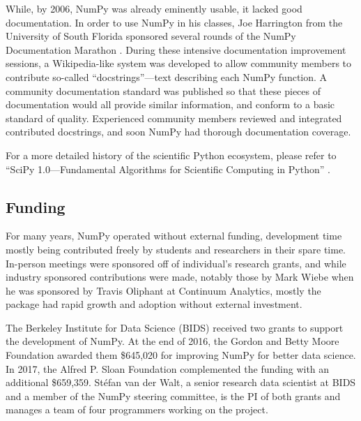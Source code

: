 \documentclass[fleqn,10pt]{wlscirep}
\begin{document}
While, by 2006, NumPy was already eminently usable, it lacked good
documentation. In order to use NumPy in his classes, Joe Harrington
from the University of South Florida sponsored several rounds of the
NumPy Documentation Marathon \cite{harrington2008scipy,vanderwalt2008scipy}.
During these intensive
documentation improvement sessions, a Wikipedia-like system was
developed to allow community members to contribute so-called
``docstrings''—text describing each NumPy function. A community
documentation standard was published so that these pieces of
documentation would all provide similar information, and conform to a
basic standard of quality. Experienced community members reviewed and
integrated contributed docstrings, and soon NumPy had thorough
documentation coverage.

For a more detailed history of the scientific Python ecosystem, please
refer to ``SciPy 1.0---Fundamental Algorithms for Scientific Computing
in Python'' \cite{virtanen2019scipy}.

\subsection*{Funding}

For many years, NumPy operated without external funding, development
time mostly being contributed freely by students and researchers in
their spare time.  In-person meetings were sponsored off of
individual's research grants, and while industry sponsored
contributions were made, notably those by Mark Wiebe when he was
sponsored by Travis Oliphant at Continuum Analytics, mostly the package had rapid growth
and adoption without external investment.



The Berkeley Institute for Data Science (BIDS) received two grants to support
the development of NumPy.
At the end of 2016, the Gordon and Betty Moore Foundation awarded them
\$645,020 for improving NumPy for better data science.
In 2017, the Alfred P. Sloan Foundation complemented the funding with an
additional \$659,359.
Stéfan van der Walt, a senior research data scientist at BIDS and a member of
the NumPy steering committee, is the PI of both grants and manages a team of
four programmers working on the project.
\end{document}
